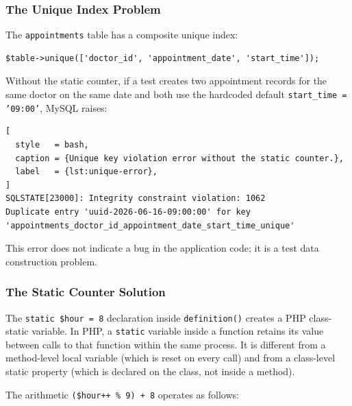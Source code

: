 \subsubsection{The Unique Index Problem}

The \texttt{appointments} table has a composite unique index:

\begin{lstlisting}[style=php, label={lst:unique-idx}]
$table->unique(['doctor_id', 'appointment_date', 'start_time']);
\end{lstlisting}

Without the static counter, if a test creates two appointment records
for the same doctor on the same date and both use the hardcoded
default \texttt{start\_time = '09:00'}, MySQL raises:

\begin{lstlisting}[
  style   = bash,
  caption = {Unique key violation error without the static counter.},
  label   = {lst:unique-error},
]
SQLSTATE[23000]: Integrity constraint violation: 1062
Duplicate entry 'uuid-2026-06-16-09:00:00' for key
'appointments_doctor_id_appointment_date_start_time_unique'
\end{lstlisting}

This error does not indicate a bug in the application code; it is a
test data construction problem.

\subsubsection{The Static Counter Solution}

The \texttt{static \$hour = 8} declaration inside \texttt{definition()}
creates a PHP class-static variable. In PHP, a \texttt{static} variable
inside a function retains its value between calls to that function within
the same process. It is different from a method-level local variable
(which is reset on every call) and from a class-level static property
(which is declared on the class, not inside a method).

The arithmetic \texttt{(\$hour++ \% 9) + 8} operates as follows:


